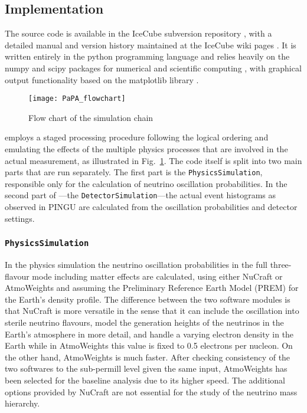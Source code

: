 \subsection{Implementation}
\label{sec:papa_code}

The \papa source code is available in the IceCube subversion repository 
\cite{papa_code}, with a detailed manual and version history maintained at the 
IceCube wiki pages \cite{papa_wiki}. It is written entirely in the python 
programming language \cite{python} and relies heavily on the numpy and scipy
packages for numerical and scientific computing \cite{numpy, scipy}, with
graphical output functionality based on the matplotlib library
\cite{matplotlib}.

\begin{figure}
\centering
 \texttt{[image: PaPA\_flowchart]}
 \caption{Flow chart of the \papa simulation chain}
\label{fig:papa_flowchart}
\end{figure}

\papa employs a staged processing procedure following the logical ordering and 
emulating the effects of the multiple physics processes that are involved in 
the actual measurement, as illustrated in Fig.~\ref{fig:papa_flowchart}. The 
code itself is split into two main parts that are run separately. The first 
part is the \texttt{PhysicsSimulation}, responsible only for the calculation of 
neutrino oscillation probabilities. In the second part of \papa---the 
\texttt{DetectorSimulation}---the actual event histograms as observed in PINGU 
are calculated from the oscillation probabilities and detector settings.


\subsubsection{\texttt{PhysicsSimulation}}

In the physics simulation the neutrino oscillation probabilities in
the full three-flavour mode including matter effects are calculated, using
either NuCraft \cite{NuCraft} or AtmoWeights \cite{AtmoWeights} and assuming
the Preliminary Reference Earth Model (PREM) \cite{PREM} for the Earth's density
profile. The difference between the two software modules is that NuCraft is more
versatile in the sense that it
can include the oscillation into sterile neutrino flavours, model the
generation heights of the neutrinos in the Earth's atmosphere in more detail,
and handle a varying electron density in the Earth while in AtmoWeights this
value is fixed to 0.5 electrons per nucleon. On the other hand, AtmoWeights is
much faster. After checking consistency of the two softwares to the sub-permill
level given the same input, AtmoWeights has been selected for the baseline
analysis due to its higher speed. The additional options provided by NuCraft are
not essential for the study of the neutrino mass hierarchy.

